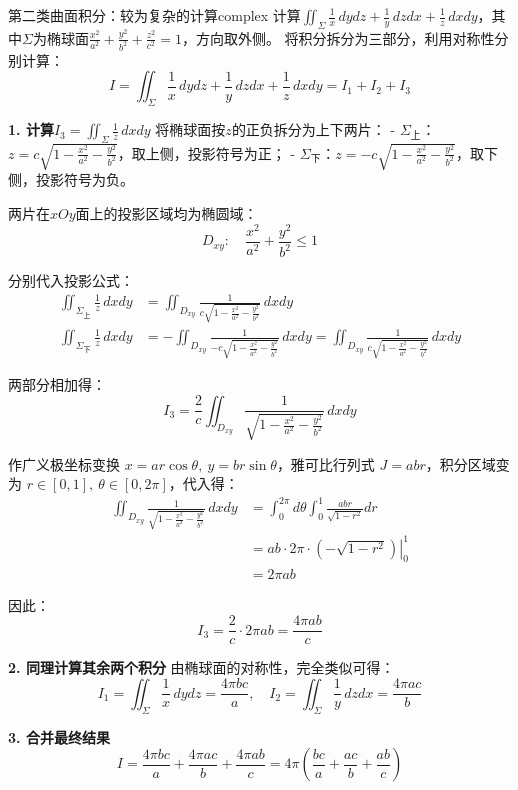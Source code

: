 \documentclass[UTF8,zihao=-4,openany]{ctexbook}
\begin{document}
\begin{example}{第二类曲面积分：较为复杂的计算}{complex}
计算$\displaystyle\iint_\Sigma \frac{1}{x} \, dydz + \frac{1}{y} \, dzdx + \frac{1}{z} \, dxdy$，其中$\Sigma$为椭球面$\frac{x^2}{a^2} + \frac{y^2}{b^2} + \frac{z^2}{c^2} = 1$，方向取外侧。
\tcblower
将积分拆分为三部分，利用对称性分别计算：
$$
I = \iint_\Sigma \frac{1}{x} \, dydz + \frac{1}{y} \, dzdx + \frac{1}{z} \, dxdy = I_1 + I_2 + I_3
$$

\textbf{1. 计算$I_3 = \displaystyle\iint_\Sigma \frac{1}{z} \, dxdy$}
将椭球面按$z$的正负拆分为上下两片：
- $\Sigma_上$：$z = c\sqrt{1 - \frac{x^2}{a^2} - \frac{y^2}{b^2}}$，取上侧，投影符号为正；
- $\Sigma_下$：$z = -c\sqrt{1 - \frac{x^2}{a^2} - \frac{y^2}{b^2}}$，取下侧，投影符号为负。

两片在$xOy$面上的投影区域均为椭圆域：
$$
D_{xy}: \quad \frac{x^2}{a^2} + \frac{y^2}{b^2} \le 1
$$

分别代入投影公式：
$$
\begin{aligned}
\iint_{\Sigma_上} \frac{1}{z} \, dxdy &= \iint_{D_{xy}} \frac{1}{c\sqrt{1 - \frac{x^2}{a^2} - \frac{y^2}{b^2}}} \, dxdy \\
\iint_{\Sigma_下} \frac{1}{z} \, dxdy &= -\iint_{D_{xy}} \frac{1}{-c\sqrt{1 - \frac{x^2}{a^2} - \frac{y^2}{b^2}}} \, dxdy = \iint_{D_{xy}} \frac{1}{c\sqrt{1 - \frac{x^2}{a^2} - \frac{y^2}{b^2}}} \, dxdy
\end{aligned}
$$

两部分相加得：
$$
I_3 = \frac{2}{c} \iint_{D_{xy}} \frac{1}{\sqrt{1 - \frac{x^2}{a^2} - \frac{y^2}{b^2}}} \, dxdy
$$

作广义极坐标变换 $x = ar\cos\theta,\ y = br\sin\theta$，雅可比行列式 $J = abr$，积分区域变为 $r\in[0,1],\ \theta\in[0,2\pi]$，代入得：
$$
\begin{aligned}
\iint_{D_{xy}} \frac{1}{\sqrt{1 - \frac{x^2}{a^2} - \frac{y^2}{b^2}}} \, dxdy
&= \int_{0}^{2\pi} d\theta \int_{0}^{1} \frac{abr}{\sqrt{1 - r^2}} dr \\
&= ab \cdot 2\pi \cdot \left. \left( -\sqrt{1 - r^2} \right) \right|_{0}^{1} \\
&= 2\pi ab
\end{aligned}
$$

因此：
$$
I_3 = \frac{2}{c} \cdot 2\pi ab = \frac{4\pi ab}{c}
$$

\textbf{2. 同理计算其余两个积分}
由椭球面的对称性，完全类似可得：
$$
I_1 = \iint_\Sigma \frac{1}{x} \, dydz = \frac{4\pi bc}{a}, \quad I_2 = \iint_\Sigma \frac{1}{y} \, dzdx = \frac{4\pi ac}{b}
$$

\textbf{3. 合并最终结果}
$$
I = \frac{4\pi bc}{a} + \frac{4\pi ac}{b} + \frac{4\pi ab}{c} = 4\pi \left( \frac{bc}{a} + \frac{ac}{b} + \frac{ab}{c} \right)
$$
\end{example}
\end{document}
